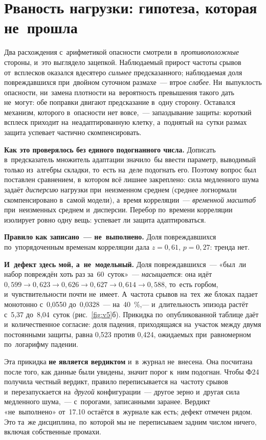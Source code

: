 \documentclass[11pt,a4paper,landscape,twocolumn]{article}
\begin{document}
\section{Рваность нагрузки: гипотеза, которая не~прошла}\label{sec:burst}
Два расхождения с~арифметикой опасности смотрели в~\emph{противоположные} стороны, и~это выглядело зацепкой. Наблюдаемый прирост частоты срывов от~всплесков оказался вдесятеро \emph{сильнее} предсказанного; наблюдаемая доля повреждавшихся при~двойном суточном размахе~— втрое \emph{слабее}. Ни~выпуклость опасности, ни~замена плотности на~вероятность превышения такого дать не~могут: обе поправки двигают предсказание в~одну сторону. Оставался механизм, которого в~опасности нет вовсе,~— запаздывание защиты: короткий всплеск приходит на~неадаптированную клетку, а~поднятый на~сутки размах защита успевает частично скомпенсировать.

\textbf{Как это проверялось без единого подогнанного числа.} Дописать в~предсказатель множитель адаптации значило~бы ввести параметр, выводимый только из~алгебры складки, то~есть на~деле подогнать его. Поэтому вопрос был поставлен сравнением, в~котором всё лишнее закреплено: сила медленного шума задаёт \emph{дисперсию} нагрузки при~неизменном среднем (среднее логнормали скомпенсировано в~самой модели), а~время корреляции~— \emph{временной масштаб} при~неизменных среднем и~дисперсии. Перебор по~времени корреляции изолирует ровно одну вещь: успевает ли защита адаптироваться.

\textbf{Правило как записано~— не~выполнено.} Доля повреждавшихся по~упорядоченным временам корреляции дала $z=0{,}61$, $p=0{,}27$: тренда нет.

\textbf{И~дефект здесь мой, а~не~модельный.} Доля повреждавшихся~— «был~ли набор повреждён хоть раз за~60~суток»~— \emph{насыщается}: она идёт $0{,}599\to0{,}623\to0{,}626\to0{,}627\to0{,}614\to0{,}588$, то~есть горбом, и~чувствительности почти не~имеет. А~частота срывов на~тех~же блоках падает монотонно с~0,0550 до~0,0328~— на~40~\%,— и~длительность эпизода растёт с~5,37 до~8,04~суток (рис.~\ref{fig:v5}б). Прикидка по~опубликованной таблице даёт и~количественное согласие: доля падения, приходящаяся на~участок между двумя постоянными защиты, равна 0,523 против 0,424, ожидаемых при~равномерном по~логарифму падении.

\begin{note}
Эта прикидка \textbf{не является вердиктом} и~в~журнал не~внесена. Она посчитана после того, как данные были увидены, значит порог к~ним подогнан. Чтобы Ф24 получила честный вердикт, правило переписывается на~частоту срывов и~перезапускается на~\emph{другой} конфигурации~— другое зерно и~другая сила медленного шума,~— с~порогами, записанными заранее. Вердикт «не~выполнено» от~17.10 остаётся в~журнале как есть; дефект отмечен рядом. Это та~же дисциплина, по~которой мы не~переписываем задним числом ничего, включая собственные промахи.
\end{note}
\end{document}
